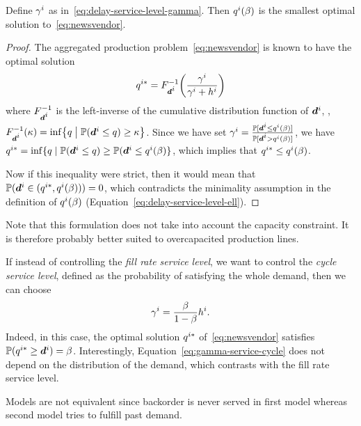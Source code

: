 \begin{prop}\label{prop:vendor}
Define $\gamma^i$ as in~\eqref{eq:delay-service-level-gamma}. Then $q^i(\beta)$ is the smallest optimal solution to~\eqref{eq:newsvendor}.
\end{prop}

\begin{proof}
The aggregated production problem~\eqref{eq:newsvendor} is known to have the optimal solution
$$\quantity^{i*} = F_{\va d^i}^{-1}\bracket{\frac{\backorder^i}{\backorder^i+h^i}}$$ where $F_{\va d^i}^{-1}$ is the left-inverse of the cumulative distribution function of $\va d^i$,
\ie, $F_{\va d^i}^{-1}(\kappa) = \inf\crbracket{ \quantity\; \big| \; \PP(\va d^i \leq \quantity) \geq \kappa}$.
Since we have set $\backorder^i=\frac{\PP[\va d^i\leq \quantity^i(\servicelvl)]}{\PP[\va d^i>\quantity^i(\servicelvl)]}$,
we have $\quantity^{i*}=\inf\{\quantity \; | \; \PP(\va d^i \leq \quantity) \geq \PP(\va d^i \leq \quantity^i(\beta) \}$, which implies that $q^{i*}\leq q^i(\beta)$.

Now if this inequality were strict, then it would mean that $\PP(\va\demand^i\in(\quantity^{i*},\quantity^i(\beta)))=0$, which contradicts the minimality assumption in the definition of $q^i(\beta)$ (Equation~\eqref{eq:delay-service-level-ell}).
\end{proof}

Note that this formulation does not take into account the capacity constraint. It is therefore probably better suited to overcapacited production lines.

\begin{rmq}
If instead of controlling the {\em fill rate service level}, we want to control the {\em cycle service level}, defined as the probability of satisfying the whole demand, then we can choose
\begin{equation}
\label{eq:gamma-service-cycle}
\gamma^i = \frac{\beta}{1-\beta} h^i.
\end{equation}
Indeed, in this case, the optimal solution $q^{i*}$ of~\eqref{eq:newsvendor} satisfies $\PP(\quantity^{i*} \geq \va d^i) = \servicelvl$. Interestingly, Equation~\eqref{eq:gamma-service-cycle} does not depend on the distribution of the demand, which contrasts with the fill rate service level.
\end{rmq}




\begin{rmq}
Models are not equivalent since backorder is never served in first model whereas second model tries to fulfill past demand.
\end{rmq}



